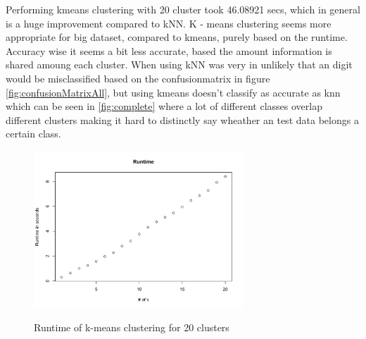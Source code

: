 \documentclass[10pt,a4paper]{article}
\begin{document}
\begin{figure}[H]
  		 \hspace{1em}
	\end{figure}


Performing kmeans clustering with 20 cluster took 46.08921 secs, which in general is a huge improvement compared to kNN.   K - means clustering seems more appropriate for big dataset,  compared to kmeans, purely based on the runtime.   Accuracy wise it seems a bit less accurate, based the amount information is shared amoung each cluster.  When using kNN was very in unlikely that an digit would be misclassified based on the confusionmatrix  in figure \ref{fig:confusionMatrixAll}, but using kmeans doesn't classify as accurate as knn which can be seen in \ref{fig:complete} where a lot of different classes overlap different clusters making it hard to distinctly say wheather an test data belongs a certain class. 

\begin{figure}[H]
\centering
\includegraphics[width = 0.7\textwidth]{runtime.png}
\label{fig:runtime}
\caption{Runtime of k-means clustering for 20 clusters}
\end{figure}
\end{document}
